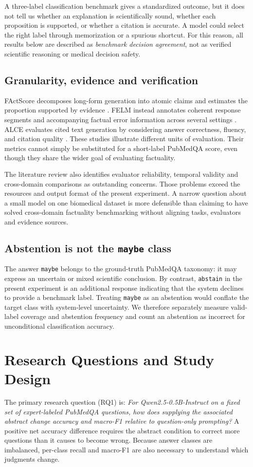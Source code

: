 \documentclass[conference]{IEEEtran}
\begin{document}
A three-label classification benchmark gives a standardized outcome, but it does not tell us whether an explanation is scientifically sound, whether each proposition is supported, or whether a citation is accurate. A model could select the right label through memorization or a spurious shortcut. For this reason, all results below are described as \emph{benchmark decision agreement}, not as verified scientific reasoning or medical decision safety.

\subsection{Granularity, evidence and verification}
FActScore decomposes long-form generation into atomic claims and estimates the proportion supported by evidence \cite{factscore}. FELM instead annotates coherent response segments and accompanying factual error information across several settings \cite{felm}. ALCE evaluates cited text generation by considering answer correctness, fluency, and citation quality \cite{alce}. These studies illustrate different units of evaluation. Their metrics cannot simply be substituted for a short-label PubMedQA score, even though they share the wider goal of evaluating factuality.

The literature review also identifies evaluator reliability, temporal validity and cross-domain comparisons as outstanding concerns. Those problems exceed the resources and output format of the present experiment. A narrow question about a small model on one biomedical dataset is more defensible than claiming to have solved cross-domain factuality benchmarking without aligning tasks, evaluators and evidence sources.

\subsection{Abstention is not the \texttt{maybe} class}
The answer \texttt{maybe} belongs to the ground-truth PubMedQA taxonomy: it may express an uncertain or mixed scientific conclusion. By contrast, \texttt{abstain} in the present experiment is an additional response indicating that the system declines to provide a benchmark label. Treating \texttt{maybe} as an abstention would conflate the target class with system-level uncertainty. We therefore separately measure valid-label coverage and abstention frequency and count an abstention as incorrect for unconditional classification accuracy.

\section{Research Questions and Study Design}
The primary research question (RQ1) is: \emph{For Qwen2.5-0.5B-Instruct on a fixed set of expert-labeled PubMedQA questions, how does supplying the associated abstract change accuracy and macro-F1 relative to question-only prompting?} A positive net accuracy difference requires the abstract condition to correct more questions than it causes to become wrong. Because answer classes are imbalanced, per-class recall and macro-F1 are also necessary to understand which judgments change.
\end{document}
